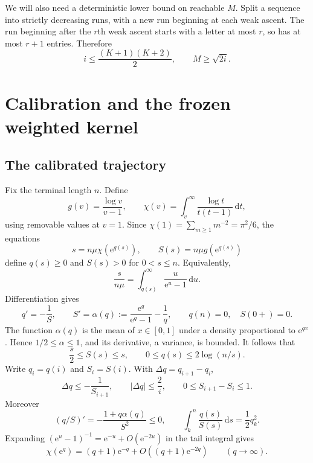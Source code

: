 \documentclass[11pt,a4paper]{article}
\theoremstyle{remark}\newtheorem{remark}[theorem]{Remark}
\newcommand{\dd}{\,\mathrm d}\newcommand{\ee}{\mathrm e}\newcommand{\Wc}{\mathcal W}
\numberwithin{equation}{section}
\begin{document}
We will also need a deterministic lower bound on reachable $M$. Split a sequence into strictly decreasing runs, with a new run beginning at each weak ascent. The run beginning after the $r$th weak ascent starts with a letter at most $r$, so has at most $r+1$ entries. Therefore
\begin{equation}\label{wasc:lv:eq:reachable}
i\le\frac{(K+1)(K+2)}2,\qquad M\ge\sqrt{2i}.
\end{equation}

\section{Calibration and the frozen weighted kernel}\label{wasc:lv:sec:calibration}
\subsection{The calibrated trajectory}
Fix the terminal length $n$. Define
\begin{equation}\label{wasc:lv:eq:gchi}
g(v)=\frac{\log v}{v-1},\qquad
\chi(v)=\int_v^\infty\frac{\log t}{t(t-1)}\dd t,
\end{equation}
using removable values at $v=1$. Since $\chi(1)=\sum_{m\ge1}m^{-2}=\pi^2/6$, the equations
\begin{equation}\label{wasc:lv:eq:calibrate}
s=n\mu\chi(\ee^{q(s)}),\qquad S(s)=n\mu g(\ee^{q(s)})
\end{equation}
define $q(s)\ge0$ and $S(s)>0$ for $0<s\le n$. Equivalently,
\[
\frac{s}{n\mu}=\int_{q(s)}^\infty\frac{u}{\ee^u-1}\dd u.
\]
Differentiation gives
\begin{equation}\label{wasc:lv:eq:calderiv}
q'=-\frac1S,\qquad S'=\alpha(q):=\frac{\ee^q}{\ee^q-1}-\frac1q,
\qquad q(n)=0,\quad S(0+)=0.
\end{equation}
The function $\alpha(q)$ is the mean of $x\in[0,1]$ under a density proportional to $\ee^{qx}$. Hence $1/2\le\alpha\le1$, and its derivative, a variance, is bounded. It follows that
\begin{equation}\label{wasc:lv:eq:calbounds}
\frac s2\le S(s)\le s,\qquad 0\le q(s)\le2\log(n/s).
\end{equation}
Write $q_i=q(i)$ and $S_i=S(i)$. With $\Delta q=q_{i+1}-q_i$,
\begin{equation}\label{wasc:lv:eq:caldiscrete}
\Delta q\le-\frac1{S_{i+1}},\qquad |\Delta q|\le\frac2i,
\qquad 0\le S_{i+1}-S_i\le1.
\end{equation}
Moreover
\begin{equation}\label{wasc:lv:eq:qsover}
(q/S)'=-\frac{1+q\alpha(q)}{S^2}\le0,
\qquad\int_k^n\frac{q(s)}{S(s)}\dd s=\frac12q_k^2.
\end{equation}
Expanding $(\ee^u-1)^{-1}=\ee^{-u}+O(\ee^{-2u})$ in the tail integral gives
\begin{equation}\label{wasc:lv:eq:chitail}
\chi(\ee^q)=(q+1)\ee^{-q}+O((q+1)\ee^{-2q})\qquad(q\to\infty).
\end{equation}
\end{document}
